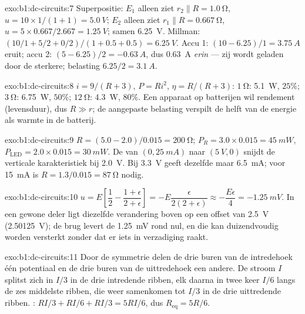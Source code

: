 \begin{solution}{exo:b1:dc-circuits:7}
Superpositie: $E_1$ alleen ziet $r_2 \parallel R = \qty{1.0}{\ohm}$,
$u = 10 \times 1/(1 + 1) = \qty{5.0}{V}$; $E_2$ alleen ziet $r_1 \parallel R
= \qty{0.667}{\ohm}$, $u = 5 \times 0.667/2.667 = \qty{1.25}{V}$; samen
\qty{6.25}{V}. Millman: $(10/1 + 5/2 + 0/2)/(1 + 0.5 + 0.5) = \qty{6.25}{V}$.
Accu 1: $(10 - 6.25)/1 = \qty{3.75}{A}$ eruit; accu 2: $(5 - 6.25)/2
= \qty{-0.63}{A}$, dus \qty{0.63}{A} \emph{erin} --- zij wordt
geladen door de sterkere; belasting $6.25/2 = \qty{3.1}{A}$.
\end{solution}

\begin{solution}{exo:b1:dc-circuits:8}
$i = 9/(R + 3)$, $P = Ri^2$, $\eta = R/(R + 3)$: $\qty{1}{\ohm}$:
\qty{5.1}{W}, $25\%$; $\qty{3}{\ohm}$: \qty{6.75}{W}, $50\%$;
$\qty{12}{\ohm}$: \qty{4.3}{W}, $80\%$. Een apparaat op batterijen wil
rendement (levensduur), dus $R \gg r$; de aangepaste belasting verspilt de helft
van de energie als warmte in de batterij.
\end{solution}

\begin{solution}{exo:b1:dc-circuits:9}
$R = (5.0 - 2.0)/0.015 = \qty{200}{\ohm}$; $P_R = 3.0 \times 0.015 =
\qty{45}{mW}$, $P_{\mathrm{LED}} = 2.0 \times 0.015 = \qty{30}{mW}$. De
 van $(0, \qty{25}{mA})$ naar $(\qty{5}{V}, 0)$ snijdt de verticale
karakteristiek bij \qty{2.0}{V}. Bij \qty{3.3}{V} geeft dezelfde 
maar \qty{6.5}{mA}; voor \qty{15}{mA} is $R = 1.3/0.015 =
\qty{87}{\ohm}$ nodig.
\end{solution}

\begin{solution}{exo:b1:dc-circuits:10}
$u = E\left[\dfrac12 - \dfrac{1 + \epsilon}{2 + \epsilon}\right] =
-E\dfrac{\epsilon}{2(2 + \epsilon)} \approx -\dfrac{E\epsilon}{4} =
\qty{-1.25}{mV}$. In een gewone deler ligt diezelfde verandering boven op een
offset van \qty{2.5}{V} (\qty{2.50125}{V}); de brug levert de
\qty{1.25}{mV} rond nul, en die kan duizendvoudig worden versterkt
zonder dat er iets in verzadiging raakt.
\end{solution}

\begin{solution}{exo:b1:dc-circuits:11}
Door de symmetrie delen de drie buren van de intredehoek één
potentiaal en de drie buren van de uittredehoek een andere. De stroom
$I$ splitst zich in $I/3$ in de drie intredende ribben, elk daarna in twee
keer $I/6$ langs de zes middelste ribben, die weer samenkomen tot $I/3$ in de
drie uittredende ribben. : $RI/3 + RI/6 + RI/3 = 5RI/6$, dus
$R_{\mathrm{eq}} = 5R/6$.
\end{solution}

